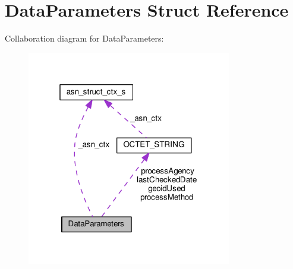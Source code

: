 \hypertarget{structDataParameters}{}\section{Data\+Parameters Struct Reference}
\label{structDataParameters}


Collaboration diagram for Data\+Parameters\+:\nopagebreak
\begin{figure}[H]
\begin{center}
\leavevmode
\includegraphics[width=253pt]{structDataParameters__coll__graph}
\end{center}
\end{figure}
